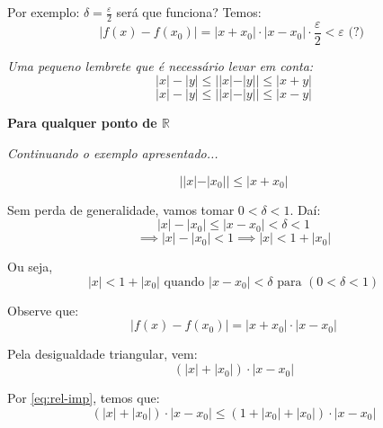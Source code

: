 \documentclass[12pt]{article}
\begin{document}
    Por exemplo: $\delta = \frac{\varepsilon}{2}$ será que funciona? Temos:
    \begin{equation*}
        |f(x) - f(x_0)| = |x + x_0| \cdot |x - x_0| \cdot \frac{\varepsilon}{2} < \varepsilon \text{ (?) } 
    \end{equation*}
    
    \textit{Uma pequeno lembrete que é necessário levar em conta:}
    \begin{equation*}
        |x| - |y| \leq ||x|-|y|| \leq |x+y|
    \end{equation*}
    \begin{equation*}
        |x| - |y| \leq ||x| - |y|| \leq |x-y|
    \end{equation*}
    
    \textbf{Para qualquer ponto de $\mathbb{R}$}
    
    \textit{Continuando o exemplo apresentado...}
    
    \begin{equation*}
        ||x| - |x_0|| \leq |x+x_0| 
    \end{equation*}
    
    Sem perda de generalidade, vamos tomar  $0 < \delta < 1$. Daí:
    \begin{equation*}
        |x| - |x_0| \leq |x - x_0| < \delta < 1
    \end{equation*}
    \begin{equation*}
        \implies |x| - |x_0| < 1 \implies |x| < 1 + |x_0|
    \end{equation*}
    
    Ou seja, 
    \begin{equation}
        |x| < 1 + |x_0| \text{ quando } |x-x_0| < \delta \text{ para } (0 < \delta < 1)
        \label{eq:rel-imp}
    \end{equation}
    
    Observe que:
    \begin{equation*}
        |f(x) - f(x_0)| = |x + x_0| \cdot |x - x_0|
    \end{equation*}
    
    Pela desigualdade triangular, vem:
    \begin{equation*}
        (|x| + |x_0|) \cdot |x-x_0| 
    \end{equation*}
    
    Por \ref{eq:rel-imp}, temos que:
    \begin{equation*}
         (|x| + |x_0|) \cdot |x-x_0| \leq (1+ |x_0| + |x_0|) \cdot |x- x_0|
    \end{equation*}
\end{document}
